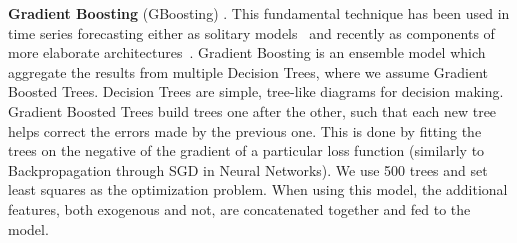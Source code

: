 \documentclass{article}
\begin{document}
\textbf{Gradient Boosting} (GBoosting) \cite{friedman_2001}. This fundamental technique has been used in time series forecasting either as solitary models~\cite{ henzel2020gradient} and recently as components of more elaborate architectures~\cite{ilic2021explainable}. Gradient Boosting is an ensemble model which aggregate the results from multiple Decision Trees, where we assume Gradient Boosted Trees. Decision Trees are simple, tree-like diagrams for decision making. 
Gradient Boosted Trees build trees one after the other, such that each new tree helps correct the errors made by the previous one. This is done by fitting the trees on the negative of the gradient of a particular loss function (similarly to Backpropagation through SGD in Neural Networks). We use 500 trees and set least squares as the optimization problem. When using this model, the additional features, both exogenous and not, are concatenated together and fed to the model. 
\end{document}
